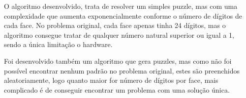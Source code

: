 O algoritmo desenvolvido, trata de resolver um simples puzzle, mas com uma complexidade que aumenta exponencialmente conforme o número de dígitos de cada face. No problema original, cada face apenas tinha 24 dígitos, mas o algoritmo consegue tratar de qualquer número natural superior ou igual a 1, sendo a única limitação o hardware.

Foi desenvolvido também um algoritmo que gera puzzles, mas como não foi possível encontrar nenhum padrão no problema original, estes são preenchidos aleatoriamente, logo quanto maior for número de dígitos por face, mais complicado é de conseguir encontrar um problema com uma solução única.

%
